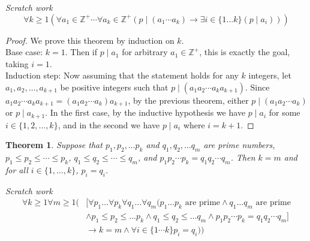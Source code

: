 \documentclass{report}
\newtheorem*{theorem}{Theorem}
\theoremstyle{definition}
\begin{document}
\noindent\textit{Scratch work}
\begin{equation*}
\forall k\geq1(\forall a_1\in\mathbb Z^+\cdots\forall a_k\in\mathbb Z^+(p\mid(a_1\cdots a_k)\to\exists i\in\{1\ldots k\}(p\mid a_i)))
\end{equation*}
\begin{proof}
We prove this theorem by induction on $k$.\\
\indent Base case: $k=1$. Then if $p\mid a_1$ for arbitrary $a_1\in\mathbb Z^+$, this is exactly the goal, taking $i=1$.\\
\indent Induction step: Now assuming that the statement holds for any $k$ integers, let $a_1,a_2,\ldots,a_{k+1}$ be positive integers such that $p\mid(a_1a_2\cdots a_ka_{k+1})$. 
Since $a_1a_2\cdots a_ka_{k+1}=(a_1a_2\cdots a_k)a_{k+1}$, by the previous theorem, either $p\mid(a_1a_2\cdots a_k)$ or $p\mid a_{k+1}$. In the first case, by the inductive hypothesis we have $p\mid a_i$ for some $i\in\{1,2,\ldots,k\}$, and in the second we have $p\mid a_i$ where $i=k+1$.
\end{proof}
\begin{theorem}
Suppose that $p_1,p_2,\ldots p_k$ and $q_1,q_2,\ldots q_m$ are prime numbers, $p_1\leq p_2\leq\cdots\leq p_k$, $q_1\leq q_2\leq\cdots\leq q_m$, and $p_1p_2\cdots p_k=q_1q_2\cdots q_m$. Then 
$k=m$ and for all $i\in\{1,\ldots,k\}$, $p_i=q_i$.
\end{theorem}
\noindent\textit{Scratch work}
\begin{align*}
\forall k\geq1\forall m\geq1(&[\forall p_1\ldots\forall p_k\forall q_1\ldots\forall q_m(p_1\ldots p_k\text{ are prime}\land q_1\ldots q_m\text{ are prime}\\
&\land p_1\leq p_2\leq\ldots p_k\land q_1\leq q_2\leq\ldots q_m\land p_1p_2\cdots p_k=q_1q_2\cdots q_m]\\
&\to k=m\land\forall i\in\{1\cdots k\}p_i=q_i))
\end{align*}
\end{document}
